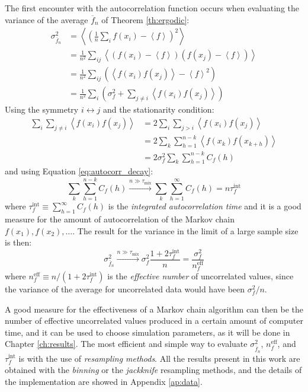 The first encounter with the autocorrelation function occurs when evaluating the variance of the average $\overline f_n$ of Theorem \ref{th:ergodic}:
\begin{align*}
    \sigma_{\overline f_n}^2 &= \left<\left(\frac{1}{n}\sum_if(x_i) - \left<f\right>\right)^2\right> \\
                             &= \frac{1}{n^2}\sum_{ij}\left<(f(x_i)-\left<f\right>)(f(x_j)-\left<f\right>)\right> \\
                             &= \frac{1}{n^2}\sum_{ij}\left(\left<f(x_i)f(x_j)\right>-\left<f\right>^2\right) \\
                             &= \frac{1}{n^2}\sum_i\left(\sigma_f^2+\sum_{j \neq i}\left<f(x_i)f(x_j)\right>\right)
\end{align*}
Using the symmetry $i \leftrightarrow j$ and the stationarity condition:
\begin{align*}
    \sum_i\sum_{j\neq i}\left<f(x_i)f(x_j)\right> &= 2\sum_i\sum_{j>i}\left<f(x_i)f(x_j)\right> \\
                                                  &= 2\sum_k\sum_{h=1}^{n-k}\left<f(x_k)f(x_{k+h})\right> \\
                                                  &= 2\sigma_f^2\sum_k\sum_{h=1}^{n-k}C_f(h)
\end{align*}
and using Equation \eqref{eq:autocorr_decay}:
\[
    \sum_k\sum_{h=1}^{n-k}C_f(h) \xrightarrow{n\gg\tau_\mathrm{mix}} \sum_k\sum_{h=1}^\infty C_f(h) = n\tau_f^\mathrm{int}
\]
where $\tau_f^\mathrm{int} \equiv \sum_{h=1}^\infty C_f(h)$ is the \emph{integrated autocorrelation time} and
it is a good measure for the amount of autocorrelation of the Markov chain $f(x_1), f(x_2), \ldots$.
The result for the variance in the limit of a large sample size is then:
\begin{equation}\label{eq:variance}
    \sigma_{\overline f_n}^2 \xrightarrow{n\gg\tau_\mathrm{mix}} \sigma_f^2\frac{1+2\tau_f^\mathrm{int}}{n}
                             = \frac{\sigma_f^2}{n_f^\mathrm{eff}}
\end{equation}
where $n_f^\mathrm{eff} \equiv n/(1+2\tau_f^\mathrm{int})$ is the \emph{effective number} of uncorrelated values,
since the variance of the average for uncorrelated data would have been $\sigma_f^2/n$.

A good measure for the effectiveness of a Markov chain algorithm can then be the number of effective uncorrelated values produced in a certain amount of computer time,
and it can be used to choose simulation parameters, as it will be done in Chapter \ref{ch:results}.
The most efficient and simple way to evaluate $\sigma_{\overline f_n}^2$, $n_f^\mathrm{eff}$, and $\tau_f^\mathrm{int}$ is with the use of \emph{resampling methods}.
All the results present in this work are obtained with the \emph{binning} or the \emph{jackknife} resampling methods,
and the details of the implementation are showed in Appendix \ref{ap:data}.

